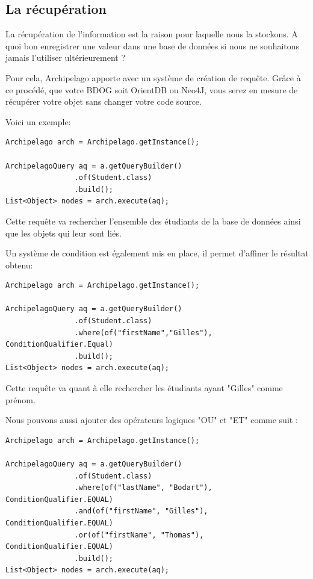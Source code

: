 \documentclass[a4paper,fleqn,12pt]{report}
\begin{document}
\subsection{La récupération}

La récupération de l'information est la raison pour laquelle nous la stockons. A quoi bon enregistrer une valeur dans une base de données si nous ne souhaitons jamais l'utiliser ultérieurement ?

Pour cela, Archipelago apporte avec un système de création de requête. Grâce à ce procédé, que votre BDOG soit OrientDB ou Neo4J, vous serez en mesure de récupérer votre objet sans changer votre code source. 

Voici un exemple:

\begin{lstlisting}
Archipelago arch = Archipelago.getInstance();

ArchipelagoQuery aq = a.getQueryBuilder()
                .of(Student.class)
                .build();
List<Object> nodes = arch.execute(aq);
\end{lstlisting}

Cette requête va rechercher l'ensemble des étudiants de la base de données ainsi que les objets qui leur sont liés.

Un système de condition est également mis en place, il permet d'affiner le résultat obtenu: 

\begin{lstlisting}
Archipelago arch = Archipelago.getInstance();

ArchipelagoQuery aq = a.getQueryBuilder()
                .of(Student.class)
                .where(of("firstName","Gilles"), ConditionQualifier.Equal)
                .build();
List<Object> nodes = arch.execute(aq);
\end{lstlisting}

Cette requête va quant à elle rechercher les étudiants ayant "Gilles" comme prénom.

Nous pouvons aussi ajouter des opérateurs logiques "OU" et "ET" comme suit :
\begin{lstlisting}
Archipelago arch = Archipelago.getInstance();

ArchipelagoQuery aq = a.getQueryBuilder()
                .of(Student.class)
                .where(of("lastName", "Bodart"), ConditionQualifier.EQUAL)
                .and(of("firstName", "Gilles"), ConditionQualifier.EQUAL)
                .or(of("firstName", "Thomas"), ConditionQualifier.EQUAL)
                .build();
List<Object> nodes = arch.execute(aq);
\end{lstlisting}
\end{document}
